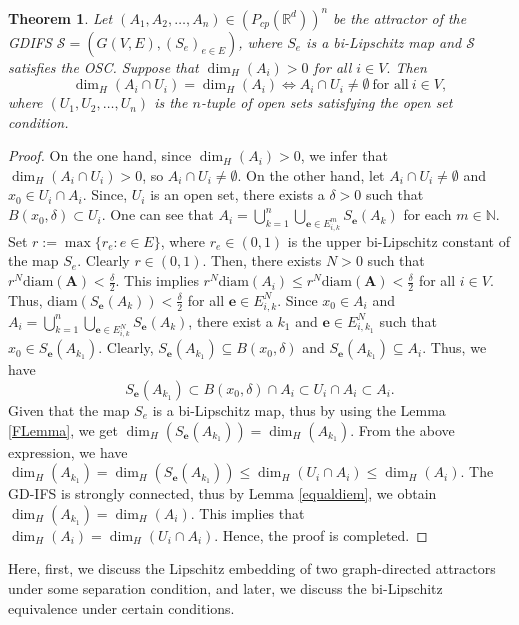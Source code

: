 \documentclass[a4paper,12pt,reqno]{amsart}
\numberwithin{equation}{section}
\newtheorem{theorem}{Theorem}[section]
\theoremstyle{definition}
\theoremstyle{remark}
\numberwithin{equation}{section}
\begin{document}
\begin{theorem}
   Let $(A_1,A_2,\dots,A_n)\in (P_{cp}(\mathbb{R}^d))^n$ be the attractor of the GDIFS
$\mathcal S=(G(V,E),(S_e)_{e\in E})$, where $S_e$ is a bi-Lipschitz map and $\mathcal S$ satisfies the OSC. Suppose that $\dim_H(A_i)>0$ for all $i \in V.$  Then $$\dim_H(A_i \cap U_i)=\dim_H(A_i) \iff A_i \cap U_i \neq \emptyset~ \text{for all}~ i \in V,$$
   where $(U_1,U_2,\dots,U_n)$ is the $n$-tuple of open sets satisfying the open set condition. 
\end{theorem}
\begin{proof}
    On the one hand, since $\dim_H(A_i)>0$, we infer that $\dim_H(A_i \cap U_i)>0$, so $A_i \cap U_i \neq \emptyset$. On the other hand, let $A_i \cap U_i \neq \emptyset$ and $x_0 \in U_i \cap A_i.$ Since, $U_i$ is an open set, there exists a $\delta>0$ such that $B(x_0, \delta) \subset U_i.$ One can see that $A_i=\bigcup_{k=1}^{n}\bigcup_{\mathbf{e}\in E_{i,k}^m}S_{\mathbf{e}}(A_k)$ for each $m\in \mathbb{N}.$  Set $r:=\max \{r_{e}: e \in E \}$, where $r_e \in (0,1)$ is the upper bi-Lipschitz constant of the map $S_e$. Clearly $r\in (0,1)$. Then, there exists $N>0$ such that $r^N \text{diam} (\mathbf{A})< \frac{\delta}{2}.$ This implies $r^N \text{diam}(A_i) \le r^N \text{diam} (\mathbf{A}) < \frac{\delta}{2}$ for all $i\in V.$ Thus, $\text{diam} (S_{\mathbf{e}}(A_k)) < \frac{\delta}{2}$ for all $\mathbf{e} \in E_{i,k}^N.$ Since $x_0\in A_i$ and  $A_i=\bigcup_{k=1}^{n}\bigcup_{\mathbf{e}\in E_{i,k}^N}S_{\mathbf{e}}(A_k)$, there exist a $k_1$ and $\mathbf{e}\in E_{i,k_1}^{N}$ such that $x_0\in S_{\mathbf{e}}(A_{k_1}).$ Clearly, $S_{\mathbf{e}}(A_{k_1})\subseteq B(x_0, \delta)$ and $S_{\mathbf{e}}(A_{k_1})\subseteq A_i$. Thus, we have
    \begin{equation}\label{EQ2}
        S_{\mathbf{e}}(A_{k_1}) \subset B(x_0, \delta) \cap A_i \subset U_i \cap A_i \subset A_i.
    \end{equation}
Given that the map $S_e$ is a bi-Lipschitz map, thus by using the Lemma \ref{FLemma},  we get $\dim_H(S_{\mathbf{e}}(A_{k_1}))=\dim_H(A_{k_1}).$ From the above expression, we have $\dim_H(A_{k_{1}})=\dim_H(S_{\mathbf{e}}(A_{k_1})) \le \dim_H(U_i \cap A_i) \le \dim_H(A_i).$ The GD-IFS is strongly connected, thus by Lemma \ref{equaldiem},  we obtain $\dim_{H}(A_{k_{1}})=\dim_H(A_i)$. This implies that $\dim_H(A_i)=\dim_H(U_i \cap A_i).$ 
    Hence, the proof is completed.
\end{proof}
  Here, first, we discuss the Lipschitz embedding of two graph-directed attractors under some separation condition, and later, we discuss the bi-Lipschitz equivalence under certain conditions. 
\end{document}
